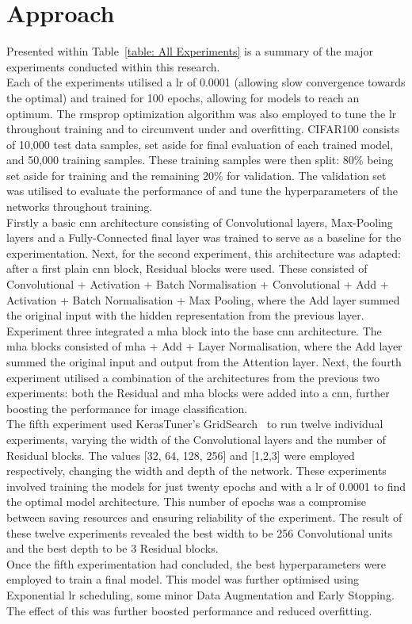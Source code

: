 \documentclass[11pt]{article}
\def\BESTWIDTH{256 }
\def\BESTDEPTH{3 }
\def\DATASET{CIFAR100 }
\begin{document}
\section{Approach}
Presented within Table~\ref{table: All Experiments} is a summary of the major experiments conducted within this research.\\
Each of the experiments utilised a \acrfull{lr} of 0.0001 (allowing slow convergence towards the optimal) and trained for 100 epochs, allowing for models to reach an optimum. The \acrfull{rmsprop} optimization algorithm was also employed to tune the \acrshort{lr} throughout training and to circumvent under and overfitting. \DATASET consists of 10,000 test data samples, set aside for final evaluation of each trained model, and 50,000 training samples. These training samples were then split: 80\% being set aside for training and the remaining 20\% for validation. The validation set was utilised to evaluate the performance of and tune the hyperparameters of the networks throughout training.\\
Firstly a basic \acrshort{cnn} architecture consisting of Convolutional layers, Max-Pooling layers and a Fully-Connected final layer was trained to serve as a baseline for the experimentation. Next, for the second experiment, this architecture was adapted: after a first plain \acrshort{cnn} block, Residual blocks were used. These consisted of Convolutional + Activation + Batch Normalisation + Convolutional + Add + Activation + Batch Normalisation + Max Pooling, where the Add layer summed the original input with the hidden representation from the previous layer. Experiment three integrated a \acrshort{mha} block into the base \acrshort{cnn} architecture. The \acrshort{mha} blocks consisted of \acrshort{mha} + Add + Layer Normalisation, where the Add layer summed the original input and output from the Attention layer. Next, the fourth experiment utilised a combination of the architectures from the previous two experiments: both the Residual and \acrshort{mha} blocks were added into a \acrshort{cnn}, further boosting the performance for image classification.\\
The fifth experiment used KerasTuner's GridSearch~\cite{kerastuner} to run twelve individual experiments, varying the width of the Convolutional layers and the number of Residual blocks. The values [32, 64, 128, 256] and [1,2,3] were employed respectively, changing the width and depth of the network. These experiments involved training the models for just twenty epochs and with a \acrshort{lr} of 0.0001 to find the optimal model architecture. This number of epochs was a compromise between saving resources and ensuring reliability of the experiment. The result of these twelve experiments revealed the best width to be \BESTWIDTH Convolutional units and the best depth to be \BESTDEPTH Residual blocks.\\
Once the fifth experimentation had concluded, the best hyperparameters were employed to train a final model. This model was further optimised using Exponential \acrshort{lr} scheduling, some minor Data Augmentation and Early Stopping. The effect of this was further boosted performance and reduced overfitting.
\end{document}
